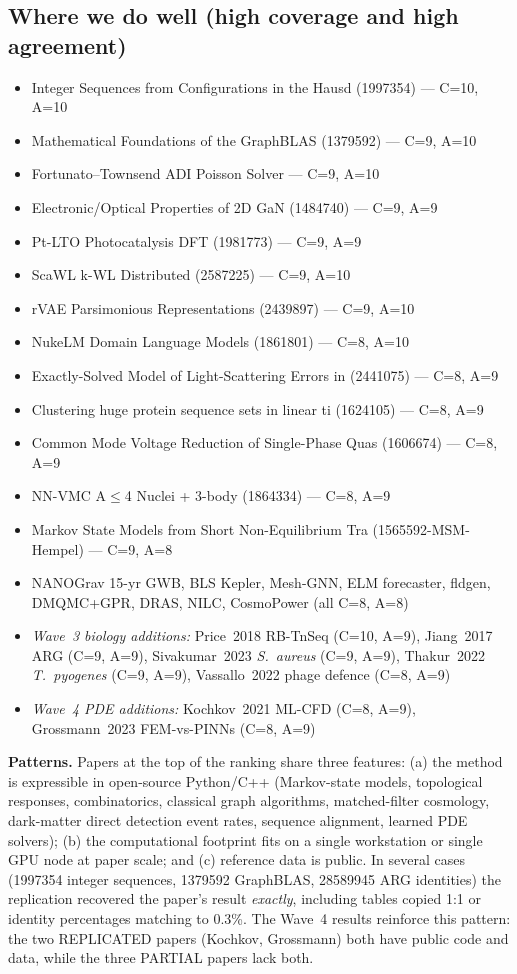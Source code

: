 \documentclass[11pt]{article}
\begin{document}
\subsection{Where we do well (high coverage and high agreement)}
\begin{itemize}[leftmargin=1.4em,itemsep=0.2em,topsep=0.2em]
\item Integer Sequences from Configurations in the Hausd (1997354) --- C=10, A=10
\item Mathematical Foundations of the GraphBLAS (1379592) --- C=9, A=10
\item Fortunato--Townsend ADI Poisson Solver --- C=9, A=10
\item Electronic/Optical Properties of 2D GaN (1484740) --- C=9, A=9
\item Pt-LTO Photocatalysis DFT (1981773) --- C=9, A=9
\item ScaWL k-WL Distributed (2587225) --- C=9, A=10
\item rVAE Parsimonious Representations (2439897) --- C=9, A=10
\item NukeLM Domain Language Models (1861801) --- C=8, A=10
\item Exactly-Solved Model of Light-Scattering Errors in (2441075) --- C=8, A=9
\item Clustering huge protein sequence sets in linear ti (1624105) --- C=8, A=9
\item Common Mode Voltage Reduction of Single-Phase Quas (1606674) --- C=8, A=9
\item NN-VMC A$\leq$4 Nuclei + 3-body (1864334) --- C=8, A=9
\item Markov State Models from Short Non-Equilibrium Tra (1565592-MSM-Hempel) --- C=9, A=8
\item NANOGrav 15-yr GWB, BLS Kepler, Mesh-GNN, ELM forecaster, fldgen, DMQMC+GPR, DRAS, NILC, CosmoPower (all C=8, A=8)
\item \textit{Wave~3 biology additions:} Price~2018 RB-TnSeq (C=10, A=9), Jiang~2017 ARG (C=9, A=9), Sivakumar~2023 \textit{S.\ aureus} (C=9, A=9), Thakur~2022 \textit{T.\ pyogenes} (C=9, A=9), Vassallo~2022 phage defence (C=8, A=9)
\item \textit{Wave~4 PDE additions:} Kochkov~2021 ML-CFD (C=8, A=9), Grossmann~2023 FEM-vs-PINNs (C=8, A=9)
\end{itemize}

\noindent\textbf{Patterns.} Papers at the top of the ranking share three
features: (a) the method is expressible in open-source Python/C++
(Markov-state models, topological responses, combinatorics, classical
graph algorithms, matched-filter cosmology, dark-matter direct detection
event rates, sequence alignment, learned PDE solvers); (b) the computational footprint fits on a
single workstation or single GPU node at paper scale; and (c) reference data
is public. In several cases (1997354 integer sequences, 1379592 GraphBLAS,
28589945 ARG identities) the replication recovered the paper's result
\emph{exactly}, including tables copied 1:1 or identity percentages matching
to 0.3\%. The Wave~4 results reinforce this pattern: the two REPLICATED
papers (Kochkov, Grossmann) both have public code and data, while the
three PARTIAL papers lack both.
\end{document}
